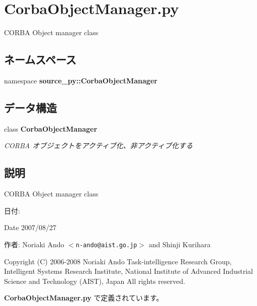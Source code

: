 \section{CorbaObjectManager.py}
\label{_corba_object_manager_8py}
CORBA Object manager class 

\subsection*{ネームスペース}
\begin{CompactItemize}
\item 
namespace \textbf{source\_\-py::CorbaObjectManager}
\end{CompactItemize}
\subsection*{データ構造}
\begin{CompactItemize}
\item 
class {\bf CorbaObjectManager}
\begin{CompactList}\small\item\em CORBA オブジェクトをアクティブ化、非アクティブ化する \item\end{CompactList}\end{CompactItemize}


\subsection{説明}
CORBA Object manager class 

\begin{Desc}
\item[日付:]\end{Desc}
\begin{Desc}
\item[Date]2007/08/27\end{Desc}
\begin{Desc}
\item[作者:]Noriaki Ando $<${\tt n-ando@aist.go.jp}$>$ and Shinji Kurihara\end{Desc}
Copyright (C) 2006-2008 Noriaki Ando Task-intelligence Research Group, Intelligent Systems Research Institute, National Institute of Advanced Industrial Science and Technology (AIST), Japan All rights reserved. 

 {\bf CorbaObjectManager.py} で定義されています。